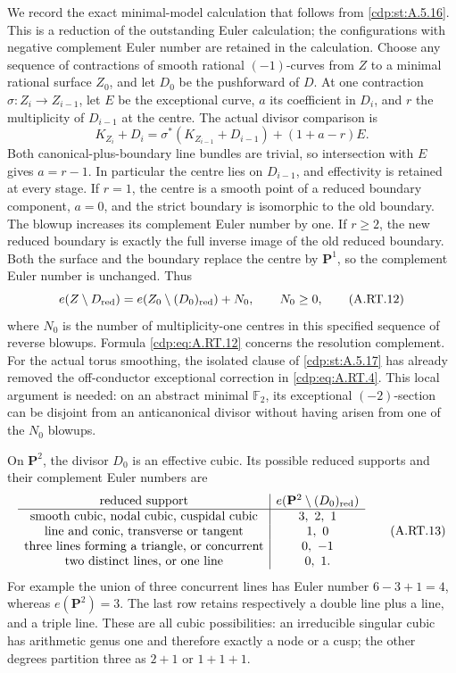 We record the exact minimal-model calculation that follows from
\ref{cdp:st:A.5.16}. This is a reduction of the outstanding Euler calculation;
the configurations with negative complement Euler number are
retained in the calculation.
Choose any sequence of contractions of smooth rational
$(-1)$-curves from $Z$ to a minimal rational surface $Z_0$,
and let $D_0$ be the pushforward of $D$. At one contraction
$\sigma:Z_i\to Z_{i-1}$, let $E$ be the exceptional curve,
$a$ its coefficient in $D_i$, and $r$ the multiplicity of
$D_{i-1}$ at the centre. The actual divisor comparison is
\[
 K_{Z_i}+D_i
   =\sigma^*(K_{Z_{i-1}}+D_{i-1})+(1+a-r)E.
 \tag{A.RT.11}\label{cdp:eq:A.RT.11}
\]
Both canonical-plus-boundary line bundles are trivial, so
intersection with $E$ gives $a=r-1$. In particular the centre
lies on $D_{i-1}$, and effectivity is retained at every stage.
If $r=1$, the centre is a smooth point of a reduced boundary
component, $a=0$, and the strict boundary is isomorphic to the
old boundary. The blowup increases its complement Euler number
by one. If $r\ge2$, the new reduced boundary is exactly the
full inverse image of the old reduced boundary. Both the
surface and the boundary replace the centre by $\mathbf P^1$,
so the complement Euler number is unchanged. Thus
\[
 e(Z\setminus D_{\rm red})
 =e(Z_0\setminus (D_0)_{\rm red})+N_0,
 \qquad N_0\ge0,
 \tag{A.RT.12}\label{cdp:eq:A.RT.12}
\]
where $N_0$ is the number of multiplicity-one centres in this
specified sequence of reverse blowups. Formula \eqref{cdp:eq:A.RT.12} concerns
the resolution complement. For the actual torus smoothing,
the isolated clause of \ref{cdp:st:A.5.17} has already removed the
off-conductor exceptional correction in \eqref{cdp:eq:A.RT.4}. This local
argument is needed: on an abstract minimal $\mathbb F_2$,
its exceptional $(-2)$-section can be disjoint from an
anticanonical divisor without having arisen from one of the
$N_0$ blowups.

On $\mathbf P^2$, the divisor $D_0$ is an effective cubic.
Its possible reduced supports and their complement Euler
numbers are
\[
\begin{array}{c|c}
 \text{reduced support}&e(\mathbf P^2\setminus(D_0)_{\rm red})\\ \hline
 \text{smooth cubic, nodal cubic, cuspidal cubic}&3,\ 2,\ 1\\
 \text{line and conic, transverse or tangent}&1,\ 0\\
 \text{three lines forming a triangle, or concurrent}&0,\ -1\\
 \text{two distinct lines, or one line}&0,\ 1.
\end{array}
\tag{A.RT.13}\label{cdp:eq:A.RT.13}
\]
For example the union of three concurrent lines has Euler
number $6-3+1=4$, whereas $e(\mathbf P^2)=3$.
The last row retains respectively a double line plus a line,
and a triple line. These are all cubic possibilities: an
irreducible singular cubic has arithmetic genus one and
therefore exactly a node or a cusp; the other degrees partition
three as $2+1$ or $1+1+1$.

